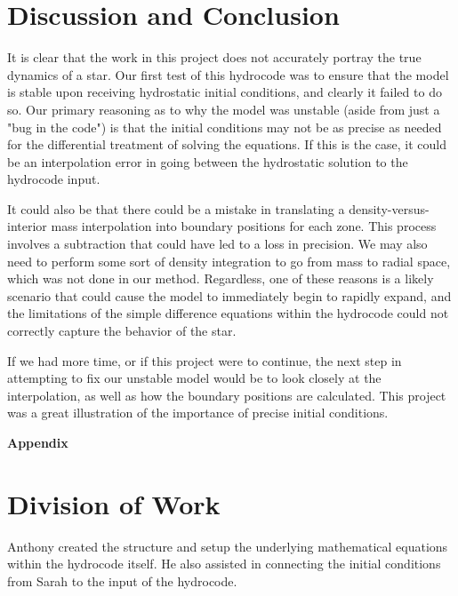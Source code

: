 \documentclass[12pt]{article}
\begin{document}
\section{Discussion and Conclusion}

It is clear that the work in this project does not accurately portray the true dynamics of
a star. Our first test of this hydrocode was to ensure that the model is stable upon receiving
hydrostatic initial conditions, and clearly it failed to do so. Our primary reasoning as to why
the model was unstable (aside from just a "bug in the code") is that the initial conditions
may not be as precise as needed for the differential treatment of solving the equations.
If this is the case, it could be an interpolation error in going between the hydrostatic solution
to the hydrocode input.

It could also be that there could be a mistake in translating a
density-versus-interior mass interpolation into boundary positions for each zone. This process
involves a subtraction that could have led to a loss in precision. We may also need to
perform some sort of density integration to go from mass to radial space, which was not
done in our method. Regardless, one of these
reasons is a likely scenario that could cause the model to immediately begin to rapidly
expand, and the limitations of the simple difference equations within the hydrocode could
not correctly capture the behavior of the star.

If we had more time, or if this project were to continue, the next step in attempting to fix
our unstable model would be to look closely at the interpolation, as well as how the boundary
positions are calculated. This project was a great illustration of the importance
of precise initial conditions.


\appendix
\begin{center}\begin{LARGE}
\textbf{Appendix}
\end{LARGE}\end{center}


\section{Division of Work}

Anthony created the structure and setup the underlying mathematical equations within the hydrocode
itself. He also assisted in connecting the initial conditions from Sarah to the input of
the hydrocode.
\end{document}
